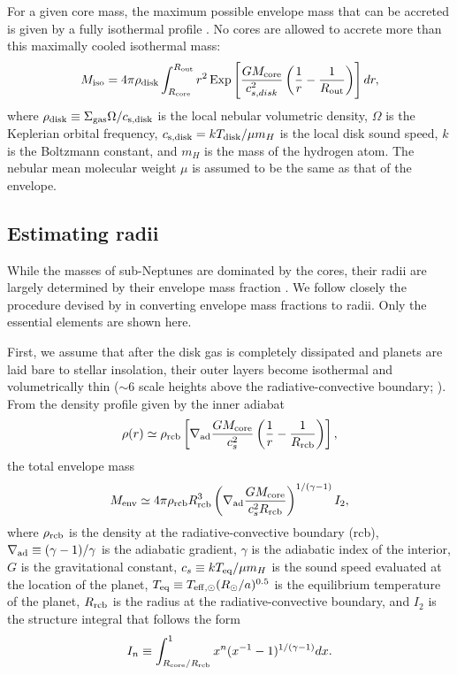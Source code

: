 \documentclass[twocolumn]{aastex63}
\begin{document}
For a given core mass, the maximum possible envelope mass that can be accreted is given by a fully isothermal profile \citep[e.g.,][]{Lee15}. No cores are allowed to accrete more than this maximally cooled isothermal mass:
%
\begin{equation}
    \label{eq:Miso}
    M_{\rm iso} = 4\pi\rho_{\rm disk}\int^{R_{\rm out}}_{R_{\rm core}} r^2\,{\rm Exp}\left[\frac{GM_{\rm core}}{c_{s,disk}^2}\left(\frac{1}{r}-\frac{1}{R_{\rm out}}\right)\right]dr,
\end{equation}
%
where $\rho_{\rm disk} \equiv \Sigma_{\rm gas}\Omega/c_{\rm s,disk}$ is the local nebular volumetric density, $\Omega$ is the Keplerian orbital frequency, $c_{\rm s,disk} = kT_{\rm disk}/\mu m_H$ is the local disk sound speed, $k$ is the Boltzmann constant, and $m_H$ is the mass of the hydrogen atom. The nebular mean molecular weight $\mu$ is assumed to be the same as that of the envelope.

\subsection{Estimating radii}

While the masses of sub-Neptunes are dominated by the cores, their radii are largely determined by their envelope mass fraction \citep{Lopez14}. We follow closely the procedure devised by \citet{Owen17} in converting envelope mass fractions to radii. Only the essential elements are shown here.

First, we assume that after the disk gas is completely dissipated and planets are laid bare to stellar insolation, their outer layers become isothermal and volumetrically thin ($\sim$6 scale heights above the radiative-convective boundary; \citealt{Lopez14}). From the density profile given by the inner adiabat
%
\begin{equation}
    \rho(r) \simeq \rho_{\rm rcb}\left[\nabla_{\rm ad}\frac{GM_{\rm core}}{c_s^2}\left(\frac{1}{r}-\frac{1}{R_{\rm rcb}}\right)\right],
\end{equation}
%
the total envelope mass
%
\begin{equation}
    \label{eq:Menv}
    M_{\rm env} \simeq 4\pi\rho_{\rm rcb}R_{\rm rcb}^3\left(\nabla_{\rm ad}\frac{GM_{\rm core}}{c_s^2 R_{\rm rcb}}\right)^{1/(\gamma-1)}I_2,
\end{equation}
%
where $\rho_{\rm rcb}$ is the density at the radiative-convective boundary (rcb), $\nabla_{\rm ad} \equiv (\gamma-1)/\gamma$ is the adiabatic gradient, $\gamma$ is the adiabatic index of the interior, $G$ is the gravitational constant, $c_s \equiv kT_{\rm eq}/\mu m_H$ is the sound speed evaluated at the location of the planet, $T_{\rm eq} \equiv T_{\rm eff,\odot}(R_\odot/a)^{0.5}$ is the equilibrium temperature of the planet, $R_{\rm rcb}$ is the radius at the radiative-convective boundary, and $I_2$ is the structure integral that follows the form
%
\begin{equation}
    \label{eq:strucI}
    I_n \equiv \int^1_{R_{\rm core}/R_{\rm rcb}} x^n (x^{-1}-1)^{1/(\gamma-1)} dx.
\end{equation}
\end{document}
